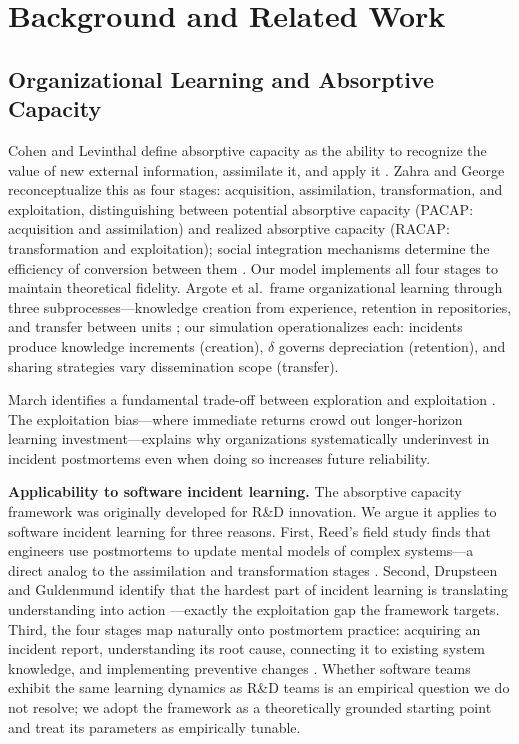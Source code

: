 \documentclass[conference,10pt]{IEEEtran}
\begin{document}
\section{Background and Related Work}

\subsection{Organizational Learning and Absorptive Capacity}

Cohen and Levinthal define absorptive capacity as the ability to recognize the value of new external information, assimilate it, and apply it \cite{cohen1990}. Zahra and George reconceptualize this as four stages: acquisition, assimilation, transformation, and exploitation, distinguishing between potential absorptive capacity (PACAP: acquisition and assimilation) and realized absorptive capacity (RACAP: transformation and exploitation); social integration mechanisms determine the efficiency of conversion between them \cite{zahra2002}. Our model implements all four stages to maintain theoretical fidelity. Argote et al.\ frame organizational learning through three subprocesses---knowledge creation from experience, retention in repositories, and transfer between units \cite{argote2021}; our simulation operationalizes each: incidents produce knowledge increments (creation), $\delta$ governs depreciation (retention), and sharing strategies vary dissemination scope (transfer).

March identifies a fundamental trade-off between exploration and exploitation \cite{march1991}. The exploitation bias---where immediate returns crowd out longer-horizon learning investment---explains why organizations systematically underinvest in incident postmortems even when doing so increases future reliability.

\textbf{Applicability to software incident learning.} The absorptive capacity framework was originally developed for R\&D innovation. We argue it applies to software incident learning for three reasons. First, Reed's field study finds that engineers use postmortems to update mental models of complex systems---a direct analog to the assimilation and transformation stages \cite{reed2019}. Second, Drupsteen and Guldenmund identify that the hardest part of incident learning is translating understanding into action \cite{drupsteen2014}---exactly the exploitation gap the framework targets. Third, the four stages map naturally onto postmortem practice: acquiring an incident report, understanding its root cause, connecting it to existing system knowledge, and implementing preventive changes \cite{zahra2002, dingsoyr2005}. Whether software teams exhibit the same learning dynamics as R\&D teams is an empirical question we do not resolve; we adopt the framework as a theoretically grounded starting point and treat its parameters as empirically tunable.
\end{document}
